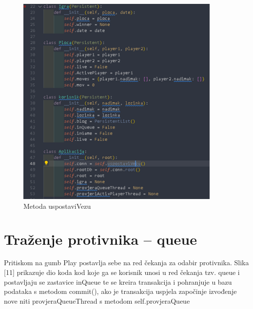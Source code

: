 \documentclass[]{foi} %
\begin{document}
\begin{figure}[]
    \centering
    \includegraphics[width=0.9\textwidth]{slike/impl_1.png}
    \caption{Metoda uspostaviVezu \cite{Vlastita izrada}}
    \label{fig:podjela}
\end{figure}



\section{Traženje protivnika – queue}

Pritiskom na gumb Play postavlja sebe na red čekanja za odabir protivnika. Slika [11] prikazuje dio koda kod koje ga se korisnik unosi u red čekanja tzv. queue i postavljaju se zastavice inQueue te se kreira transakcija i pohranjuje u bazu podataka s metodom commit(), ako je transakcija uspjela započinje izvođenje nove niti provjeraQueueThread s metodom self.provjeraQueue
\end{document}
